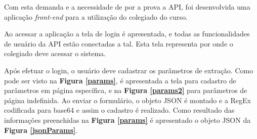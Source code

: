 Com esta demanda e a necessidade de por a prova a API, foi desenvolvida uma aplicação \textit{front-end} para a utilização do colegiado do curso. 





Ao acessar a aplicação a tela de login é apresentada, e todas as funcionalidades de usuário da API estão conectadas a tal. Esta tela representa por onde o colegiado deve acessar o sistema.

Após efetuar o login, o usuário deve cadastrar os parâmetros de extração. Como pode ser visto na \textbf{Figura \ref{params}}, é apresentada a tela para cadastro de parâmetros em página específica, e na \textbf{Figura \ref{params2}} para parâmetros de página indefinida. Ao enviar o formulário, o objeto JSON é montado e a RegEx codificada para base64 e assim o cadastro é realizado. Como resultado das informações preenchidas na \textbf{Figura \ref{params}} é apresentado o objeto JSON da \textbf{Figura \ref{jsonParams}}.

